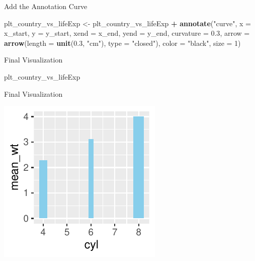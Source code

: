 \documentclass[
  ignorenonframetext,
]{beamer}
\newenvironment{Shaded}{\begin{snugshade}}{\end{snugshade}}
\newcommand{\AttributeTok}[1]{\textcolor[rgb]{0.13,0.29,0.53}{#1}}
\newcommand{\DecValTok}[1]{\textcolor[rgb]{0.00,0.00,0.81}{#1}}
\newcommand{\FloatTok}[1]{\textcolor[rgb]{0.00,0.00,0.81}{#1}}
\newcommand{\FunctionTok}[1]{\textcolor[rgb]{0.13,0.29,0.53}{\textbf{#1}}}
\newcommand{\NormalTok}[1]{#1}
\newcommand{\OtherTok}[1]{\textcolor[rgb]{0.56,0.35,0.01}{#1}}
\newcommand{\SpecialCharTok}[1]{\textcolor[rgb]{0.81,0.36,0.00}{\textbf{#1}}}
\newcommand{\StringTok}[1]{\textcolor[rgb]{0.31,0.60,0.02}{#1}}
\begin{document}
\begin{frame}[fragile]{Add the Annotation Curve}
\label{add-the-annotation-curve}

\begin{Shaded}
\begin{Highlighting}[]
\NormalTok{plt\_country\_vs\_lifeExp }\OtherTok{\textless{}{-}}\NormalTok{ plt\_country\_vs\_lifeExp }\SpecialCharTok{+} \FunctionTok{annotate}\NormalTok{(}\StringTok{"curve"}\NormalTok{,}
    \AttributeTok{x =}\NormalTok{ x\_start, }\AttributeTok{y =}\NormalTok{ y\_start, }\AttributeTok{xend =}\NormalTok{ x\_end, }\AttributeTok{yend =}\NormalTok{ y\_end, }\AttributeTok{curvature =} \FloatTok{0.3}\NormalTok{,}
    \AttributeTok{arrow =} \FunctionTok{arrow}\NormalTok{(}\AttributeTok{length =} \FunctionTok{unit}\NormalTok{(}\FloatTok{0.3}\NormalTok{, }\StringTok{"cm"}\NormalTok{), }\AttributeTok{type =} \StringTok{"closed"}\NormalTok{),}
    \AttributeTok{color =} \StringTok{"black"}\NormalTok{, }\AttributeTok{size =} \DecValTok{1}\NormalTok{)}
\end{Highlighting}
\end{Shaded}
\end{frame}

\begin{frame}[fragile]{Final Visualization}
\label{final-visualization}

\begin{Shaded}
\begin{Highlighting}[]
\NormalTok{plt\_country\_vs\_lifeExp}
\end{Highlighting}
\end{Shaded}
\end{frame}

\begin{frame}{Final Visualization}
\label{final-visualization-1}

\begin{center}\includegraphics[width=0.5\linewidth]{Figs/unnamed-chunk-111-1} \end{center}
\end{frame}
\end{document}
